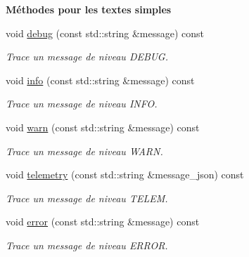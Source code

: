 \begin{Indent}\textbf{ Méthodes pour les textes simples}\par
\begin{DoxyCompactItemize}
\item 
void \hyperlink{classlogs_1_1Logger_a7dffc8f610014ec59b63392da16140e4}{debug} (const std\+::string \&message) const
\begin{DoxyCompactList}\small\item\em Trace un message de niveau D\+E\+B\+UG. \end{DoxyCompactList}\item 
void \hyperlink{classlogs_1_1Logger_aa381165771d00a6a1e3aa9664bf6467f}{info} (const std\+::string \&message) const
\begin{DoxyCompactList}\small\item\em Trace un message de niveau I\+N\+FO. \end{DoxyCompactList}\item 
void \hyperlink{classlogs_1_1Logger_a240e8d7b58195c85bd7b4e4a3417d955}{warn} (const std\+::string \&message) const
\begin{DoxyCompactList}\small\item\em Trace un message de niveau W\+A\+RN. \end{DoxyCompactList}\item 
void \hyperlink{classlogs_1_1Logger_ae55afdeeb1bc9acb6dc02a3e2d06062f}{telemetry} (const std\+::string \&message\+\_\+json) const
\begin{DoxyCompactList}\small\item\em Trace un message de niveau T\+E\+L\+EM. \end{DoxyCompactList}\item 
void \hyperlink{classlogs_1_1Logger_a8b6a2019233bc44b3c3c86c653910831}{error} (const std\+::string \&message) const
\begin{DoxyCompactList}\small\item\em Trace un message de niveau E\+R\+R\+OR. \end{DoxyCompactList}\end{DoxyCompactItemize}
\end{Indent}
